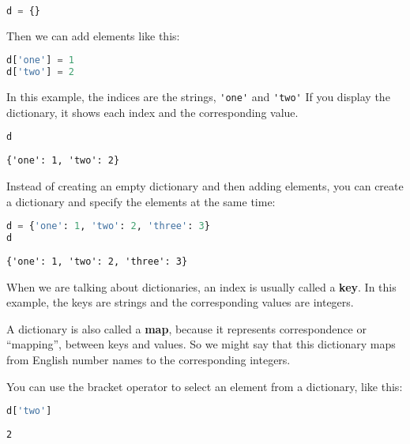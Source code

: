 \begin{lstlisting}[language=Python,style=source]
d = {}
\end{lstlisting}

Then we can add elements like this:

\begin{lstlisting}[language=Python,style=source]
d['one'] = 1
d['two'] = 2
\end{lstlisting}

In this example, the indices are the strings,
\passthrough{\lstinline!'one'!} and \passthrough{\lstinline!'two'!} If
you display the dictionary, it shows each index and the corresponding
value.

\begin{lstlisting}[language=Python,style=source]
d
\end{lstlisting}

\begin{lstlisting}[style=output]
{'one': 1, 'two': 2}
\end{lstlisting}

Instead of creating an empty dictionary and then adding elements, you
can create a dictionary and specify the elements at the same time:

\begin{lstlisting}[language=Python,style=source]
d = {'one': 1, 'two': 2, 'three': 3}
d
\end{lstlisting}

\begin{lstlisting}[style=output]
{'one': 1, 'two': 2, 'three': 3}
\end{lstlisting}

When we are talking about dictionaries, an index is usually called a
\textbf{key}. In this example, the keys are strings and the
corresponding values are integers.

A dictionary is also called a \textbf{map}, because it represents
correspondence or ``mapping'', between keys and values. So we might say
that this dictionary maps from English number names to the corresponding
integers.

You can use the bracket operator to select an element from a dictionary,
like this:

\begin{lstlisting}[language=Python,style=source]
d['two']
\end{lstlisting}

\begin{lstlisting}[style=output]
2
\end{lstlisting}

